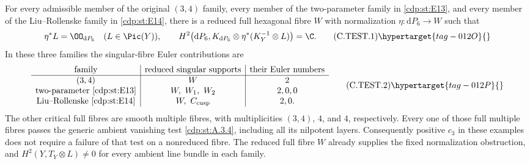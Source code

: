 \begin{proposition}\hypertarget{tag-01FQ}{}\label{cdp:st:C4g}

For every admissible member of the original $(3,4)$ family,
every member of the two-parameter family in \ref{cdp:st:E13}, and every
member of the Liu--Rollenske family in \ref{cdp:st:E14}, there is a reduced
full hexagonal fibre $W$ with normalization
$\eta:\mathrm dP_6\to W$ such that
\[
 \eta^*L=\OO_{\mathrm dP_6}\quad(L\in\Pic(Y)),\qquad
 H^2\bigl(\mathrm dP_6,K_{\mathrm dP_6}\otimes
                    \eta^*(K_Y^{-1}\otimes L)\bigr)=\C.
 \tag{C.TEST.1}\hypertarget{tag-012O}{}\label{cdp:eq:C.TEST.1}
\]
In these three families the singular-fibre Euler contributions are
\[
\begin{array}{c|c|c}
\text{family}&\text{reduced singular supports}&
                 \text{their Euler numbers}\\ \hline
(3,4)&W&2\\
\text{two-parameter \ref{cdp:st:E13}}&W,\ W_1,\ W_2&2,0,0\\
\text{Liu--Rollenske \ref{cdp:st:E14}}&W,\ C_{\rm cusp}&2,0 .
\end{array}
\tag{C.TEST.2}\hypertarget{tag-012P}{}\label{cdp:eq:C.TEST.2}
\]
The other critical full fibres are smooth multiple fibres,
with multiplicities $(3,4)$, $4$, and $4$, respectively.
Every one of those full multiple fibres passes the generic
ambient vanishing test \ref{cdp:st:A.3.4}, including all its nilpotent
layers. Consequently positive $c_3$ in these examples does
not require a failure of that test on a nonreduced fibre.
The reduced full fibre $W$ already supplies the fixed
normalization obstruction, and $H^2(Y,T_Y\otimes L)\ne0$
for every ambient line bundle in each family.
\end{proposition}


